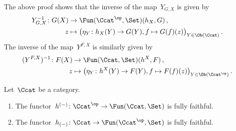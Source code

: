 \begin{remark}
  The above proof shows that the inverse of the map~$Y_{G,X}$ is given by
  \begin{align*}
              Y_{G,X}^{-1}
     \colon   G(X)
    &\to      \Fun(\Ccat^\op, \Set)(h_X, G) \,,
    \\
              z
    &\mapsto  \bigl( \eta_Y \colon h_X(Y) \to G(Y), f \mapsto G(f)(z) \bigr)_{Y \in \Ob(\Ccat)} \,.
  \end{align*}
  The inverse of the map~$Y^{F,X}$ is similarly given by
  \begin{align*}
              (Y^{F,X})^{-1}
     \colon   F(X)
    &\to      \Fun(\Ccat, \Set)(h^X, F) \,,
    \\
              z
    &\mapsto  \bigl( \eta_Y \colon h^X(Y) \to F(Y), f \mapsto F(f)(z) \bigr)_{Y \in \Ob(\Ccat^\op)} \,.
  \end{align*}
\end{remark}










\begin{theorem}
  Let~$\Ccat$ be a category.
  \begin{enumerate}
    \item
      The functor~$h^{(-)} \colon \Ccat^\op \to \Fun(\Ccat, \Set)$ is fully faithful.
    \item
      \label{contravariant yoneda embedding}
      The functor~$h_{(-)} \colon \Ccat \to \Fun(\Ccat^\op, \Set)$ is fully faithful.
  \end{enumerate}
\end{theorem}


